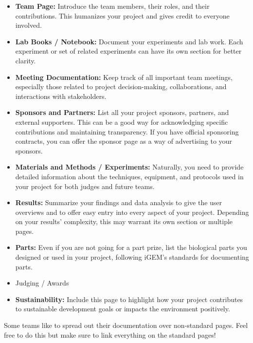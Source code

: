 \begin{itemize}
    \item \textbf{Team Page:} Introduce the team members, their roles, and their contributions.
    This humanizes your project and gives credit to everyone involved.

    \item \textbf{Lab Books / Notebook:} Document your experiments and lab work.
    Each experiment or set of related experiments can have its own section for better clarity.

    \item \textbf{Meeting Documentation:} Keep track of all important team meetings, especially those related to project decision-making, collaborations, and interactions with stakeholders.

    \item \textbf{Sponsors and Partners:} List all your project sponsors, partners, and external supporters.
    This can be a good way for acknowledging specific contributions and maintaining transparency.
    If you have official sponsoring contracts, you can offer the sponsor page as a way of advertising to your sponsors.

    \item \textbf{Materials and Methods / Experiments:} Naturally, you need to provide detailed information about the
    techniques, equipment, and protocols used in your project for both judges and future teams.

    \item \textbf{Results:} Summarize your findings and data analysis to give the user overviews and to offer easy entry into every aspect of your project.
    Depending on your results' complexity, this may warrant its own section or multiple pages.

    \item \textbf{Parts:} Even if you are not going for a part prize, list the biological parts you designed or used in
    your project, following iGEM’s standards
    for documenting parts.
    \item Judging / Awards

    \item \textbf{Sustainability:} Include this page to highlight how your project contributes to sustainable development goals or impacts the environment positively.
\end{itemize}

Some teams like to spread out their documentation over non-standard pages.
Feel free to do this but make sure to link everything on the standard pages!

